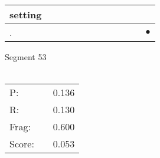 \documentclass[landscape]{article}
\newcommand{\ssp}{\hspace{2pt}}
\newcommand{\mex}{\cellcolor{g}$\bullet$}
\begin{document}
\begin{tabular}{|l|p{10pt}|p{10pt}|p{10pt}|p{10pt}|p{10pt}|p{10pt}|p{10pt}|p{10pt}|p{10pt}|p{10pt}|p{10pt}|}
\hline
\ssp setting \ssp&\hspace{2pt}&\hspace{2pt}&\hspace{2pt}&\hspace{2pt}&\hspace{2pt}&\hspace{2pt}&\hspace{2pt}&\hspace{2pt}&\hspace{2pt}&\hspace{2pt}&\hspace{2pt}\\
\hline
\ssp \cellcolor{ref10}. \ssp&\hspace{2pt}&\hspace{2pt}&\hspace{2pt}&\hspace{2pt}&\hspace{2pt}&\hspace{2pt}&\hspace{2pt}&\hspace{2pt}&\hspace{2pt}&\hspace{2pt}&\hspace{2pt}\mex\\
\hline
\end{tabular}

\vspace{6pt}
\noindent Segment 53\\\\
\noindent\begin{tabular}{lm{12pt}r}
\hline
P:&&0.136\\
R:&&0.130\\
Frag:&&0.600\\
Score:&&0.053\\
\end{tabular}

\newpage
\end{document}
